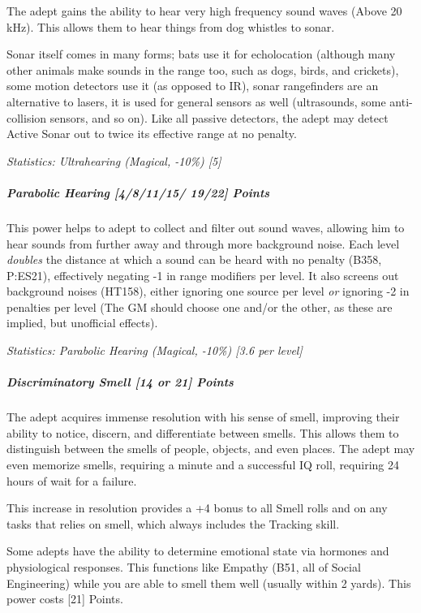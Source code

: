 \begin{multicols*}{3}
		The adept gains the ability to hear very high frequency sound waves (Above 20 kHz). This allows them to hear things from dog whistles to sonar. 
		
		Sonar itself comes in many forms; bats use it for echolocation (although many other animals make sounds in the range too, such as dogs, birds, and crickets), some motion detectors use it (as opposed to IR), sonar rangefinders are an alternative to lasers, it is used for general sensors as well (ultrasounds, some anti-collision sensors, and so on). Like all passive detectors, the adept may detect Active Sonar out to twice its effective range at no penalty.
	
		\textcolor{OliveGreen}{\textit{Statistics: Ultrahearing (Magical, -10\%) [5] }}
	
	\subparagraph{Parabolic Hearing [4/8/11/15/ 19/22] Points}
	
		This power helps to adept to collect and filter out sound waves, allowing him to hear sounds from further away and through more background noise. Each level \textit{doubles} the distance at which a sound can be heard with no penalty (B358, P:ES21), effectively negating -1 in range modifiers per level. It also screens out background noises (HT158), either ignoring one source per level \textit{or} ignoring -2 in penalties per level (The GM should choose one and/or the other, as these are implied, but unofficial effects).
	
		\textcolor{OliveGreen}{\textit{Statistics: Parabolic Hearing (Magical, -10\%) [3.6 per level] }}
		
	\subparagraph{Discriminatory Smell [14 or 21] Points}
	
		The adept acquires immense resolution with his sense of smell, improving their ability to notice, discern, and differentiate between smells. This allows them to distinguish between the smells of people, objects, and even places. The adept may even memorize smells, requiring a minute and a successful IQ roll, requiring 24 hours of wait for a failure.
		
		This increase in resolution provides a +4 bonus to all Smell rolls and on any tasks that relies on smell, which always includes the Tracking skill.
		
		Some adepts have the ability to determine emotional state via hormones and physiological responses. This functions like Empathy (B51, all of Social Engineering) while you are able to smell them well (usually within 2 yards). This power costs [21] Points.
	

\end{multicols*}
